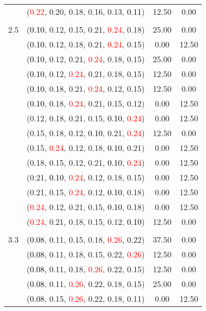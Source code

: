 \documentclass[10pt,a4paper]{report}
\begin{document}
\begin{center}
\begin{longtable}{clcc}
			&(\textcolor{red}{0.22}, 0.20, 0.18, 0.16, 0.13, \textcolor{black}{0.11})&12.50&0.00\\
		&&&\\
		2.5			&(\textcolor{black}{0.10}, 0.12, 0.15, 0.21, \textcolor{red}{0.24}, 0.18)&25.00&0.00\\
			&(\textcolor{black}{0.10}, 0.12, 0.18, 0.21, \textcolor{red}{0.24}, 0.15)&0.00&12.50\\
			&(\textcolor{black}{0.10}, 0.12, 0.21, \textcolor{red}{0.24}, 0.18, 0.15)&25.00&0.00\\
			&(\textcolor{black}{0.10}, 0.12, \textcolor{red}{0.24}, 0.21, 0.18, 0.15)&12.50&0.00\\
			&(\textcolor{black}{0.10}, 0.18, 0.21, \textcolor{red}{0.24}, 0.12, 0.15)&12.50&0.00\\
			&(\textcolor{black}{0.10}, 0.18, \textcolor{red}{0.24}, 0.21, 0.15, 0.12)&0.00&12.50\\
			&(0.12, 0.18, 0.21, 0.15, \textcolor{black}{0.10}, \textcolor{red}{0.24})&0.00&12.50\\
			&(0.15, 0.18, 0.12, \textcolor{black}{0.10}, 0.21, \textcolor{red}{0.24})&12.50&0.00\\
			&(0.15, \textcolor{red}{0.24}, 0.12, 0.18, \textcolor{black}{0.10}, 0.21)&0.00&12.50\\
			&(0.18, 0.15, 0.12, 0.21, \textcolor{black}{0.10}, \textcolor{red}{0.24})&0.00&12.50\\
			&(0.21, \textcolor{black}{0.10}, \textcolor{red}{0.24}, 0.12, 0.18, 0.15)&0.00&12.50\\
			&(0.21, 0.15, \textcolor{red}{0.24}, 0.12, \textcolor{black}{0.10}, 0.18)&0.00&12.50\\
			&(\textcolor{red}{0.24}, 0.12, 0.21, 0.15, \textcolor{black}{0.10}, 0.18)&0.00&12.50\\
			&(\textcolor{red}{0.24}, 0.21, 0.18, 0.15, 0.12, \textcolor{black}{0.10})&12.50&0.00\\
		&&&\\
		3.3			&(\textcolor{black}{0.08}, 0.11, 0.15, 0.18, \textcolor{red}{0.26}, 0.22)&37.50&0.00\\
			&(\textcolor{black}{0.08}, 0.11, 0.18, 0.15, 0.22, \textcolor{red}{0.26})&12.50&0.00\\
			&(\textcolor{black}{0.08}, 0.11, 0.18, \textcolor{red}{0.26}, 0.22, 0.15)&12.50&0.00\\
			&(\textcolor{black}{0.08}, 0.11, \textcolor{red}{0.26}, 0.22, 0.18, 0.15)&25.00&0.00\\
			&(\textcolor{black}{0.08}, 0.15, \textcolor{red}{0.26}, 0.22, 0.18, 0.11)&0.00&12.50\\

\end{longtable}
\end{center}
\end{document}
